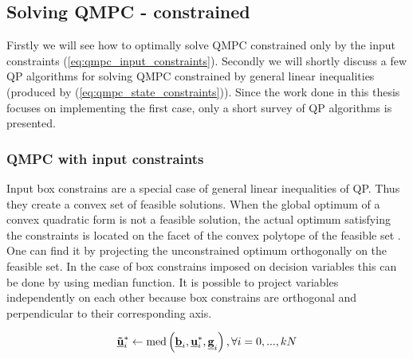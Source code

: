 \subsection{Solving QMPC - constrained}
\label{cap:qmpc_constrained}

Firstly we will see how to optimally solve QMPC constrained only by the input constraints (\ref{eq:qmpc_input_constraints}). Secondly we will shortly discuss a few QP algorithms for solving QMPC constrained by general linear inequalities (produced by (\ref{eq:qmpc_state_constraints})). Since the work done in this thesis focuses on implementing the first case, only a short survey of QP algorithms is presented.

\subsubsection{QMPC with input constraints}

Input box constrains are a special case of general linear inequalities of QP. Thus they create a convex set of feasible solutions. When the global optimum of a convex quadratic form is not a feasible solution, the actual optimum satisfying the constraints is located on the facet of the convex polytope of the feasible set \citep{boyd2004convex}. One can find it by projecting the unconstrained optimum orthogonally on the feasible set. In the case of box constrains imposed on decision variables this can be done by using $\mathrm{median}$ function. It is possible to project variables independently on each other because box constrains are orthogonal and perpendicular to their corresponding axis.

\begin{equation}
\begin{split}
\label{eq:qmpc_saturating}
\textbf{\underline{\~u}}^*_i \leftarrow \mathrm{med}\left(\textbf{\underline{b}}_i, \textbf{\underline{u}}^*_i, \textbf{\underline{g}}_i\right),  \forall i=0,...,kN
\end{split}
\end{equation}

\newcommand{\boundellipse}[3]%
{(#1) ellipse (#2 and #3)
}

